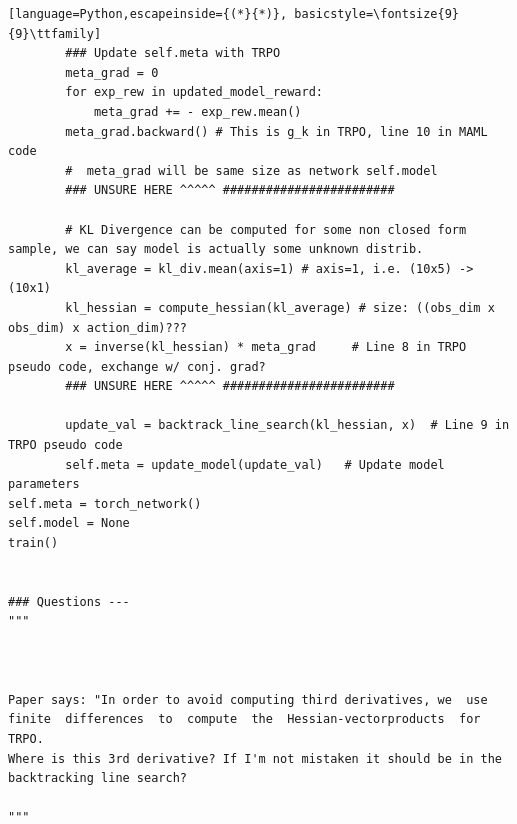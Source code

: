 \documentclass{article}
\theoremstyle{definition}
\theoremstyle{note}
\begin{document}
\begin{lstlisting}[language=Python,escapeinside={(*}{*)}, basicstyle=\fontsize{9}{9}\ttfamily]
        ### Update self.meta with TRPO
        meta_grad = 0
        for exp_rew in updated_model_reward:
            meta_grad += - exp_rew.mean()  
        meta_grad.backward() # This is g_k in TRPO, line 10 in MAML code
        #  meta_grad will be same size as network self.model
        ### UNSURE HERE ^^^^^ ########################

        # KL Divergence can be computed for some non closed form sample, we can say model is actually some unknown distrib.
        kl_average = kl_div.mean(axis=1) # axis=1, i.e. (10x5) -> (10x1)
        kl_hessian = compute_hessian(kl_average) # size: ((obs_dim x obs_dim) x action_dim)???
        x = inverse(kl_hessian) * meta_grad     # Line 8 in TRPO pseudo code, exchange w/ conj. grad?
        ### UNSURE HERE ^^^^^ ########################

        update_val = backtrack_line_search(kl_hessian, x)  # Line 9 in TRPO pseudo code
        self.meta = update_model(update_val)   # Update model parameters 
self.meta = torch_network()
self.model = None
train()


### Questions ---
"""



Paper says: "In order to avoid computing third derivatives, we  use  finite  differences  to  compute  the  Hessian-vectorproducts  for  TRPO.
Where is this 3rd derivative? If I'm not mistaken it should be in the backtracking line search?

"""
\end{lstlisting}
\end{document}
